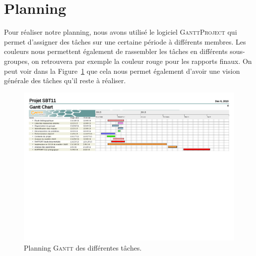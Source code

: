 \section{Planning}
\label{ann:planning}

Pour réaliser notre planning, nous avons utilisé le logiciel \textsc{GanttProject}
qui permet d'assigner des tâches sur une certaine période à différents membres.
Les couleurs nous permettent également de rassembler les tâches en différents 
sous-groupes, on retrouvera par exemple la couleur rouge pour les rapports finaux.
On peut voir dans la Figure~\ref{fig:planning_gant} que cela nous permet également
d'avoir une vision générale des tâches qu'il reste à réaliser.

\begin{figure}[h]
  \includegraphics[scale=0.51]{./annexes/planning_gant.pdf}
  \caption{Planning \textsc{Gantt} des différentes tâches.}
  \label{fig:planning_gant}
\end{figure}